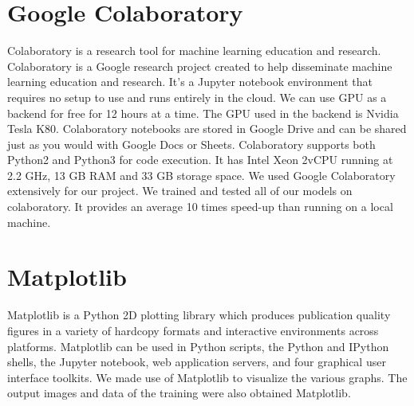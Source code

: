 \section{Google Colaboratory} %
\label{sec:google_colaboratory}
Colaboratory is a research tool for machine learning education and research. Colaboratory is a Google research project created to help disseminate machine learning education and research. It’s a Jupyter notebook environment that requires no setup to use and runs entirely in the cloud. We can use GPU as a backend for free for 12 hours at a time. The GPU used in the backend is Nvidia Tesla K80. Colaboratory notebooks are stored in Google Drive and can be shared just as you would with Google Docs or Sheets. Colaboratory supports both Python2 and Python3 for code execution. It has Intel Xeon 2vCPU running at 2.2 GHz, 13 GB RAM and 33 GB storage space.
We used Google Colaboratory extensively for our project. We trained and tested all of our models on colaboratory. It provides an average 10 times speed-up than running on a local machine. 

\section{Matplotlib} %
\label{sec:matplotlib}
Matplotlib is a Python 2D plotting library which produces publication quality figures in a variety of hardcopy formats and interactive environments across platforms. Matplotlib can be used in Python scripts, the Python and IPython shells, the Jupyter notebook, web application servers, and four graphical user interface toolkits.
We made use of Matplotlib to visualize the various graphs. The output images and data of the training were also obtained Matplotlib.




